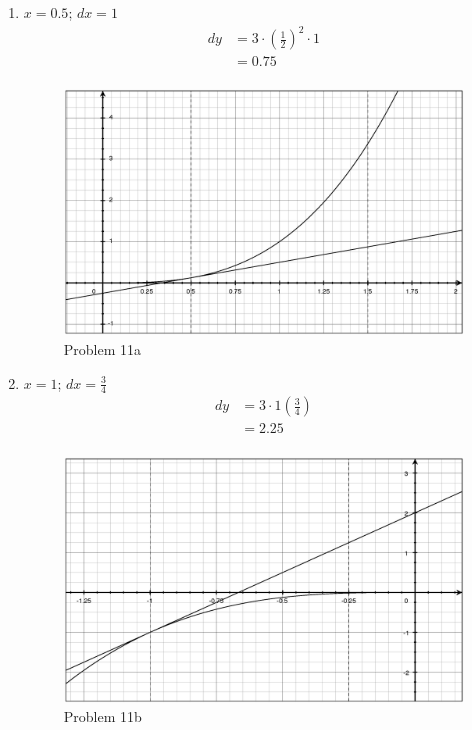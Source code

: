 \documentclass[fleqn]{exam}
\begin{document}
\begin{description}
\begin{enumerate}[a]
\item
$x = 0.5$; $dx = 1$
\begin{align*}
  dy &= 3 \cdot \left(\frac{1}{2} \right)^2 \cdot 1 \\
     &= 0.75 \\
\end{align*}

\begin{figure}[H]
  \centering
  \includegraphics[scale=.3]{problem_11a.eps}
  \caption*{Problem 11a}
\end{figure}

\item
$x = 1$; $dx = \frac{3}{4}$
\begin{align*}
  dy &= 3 \cdot 1 \left(\frac{3}{4} \right) \\
     &= 2.25 \\
\end{align*}


\begin{figure}[H]
  \centering
  \includegraphics[scale=.3]{problem_11b.eps}
  \caption*{Problem 11b}
\end{figure}


\end{enumerate}
\end{description}
\end{document}
